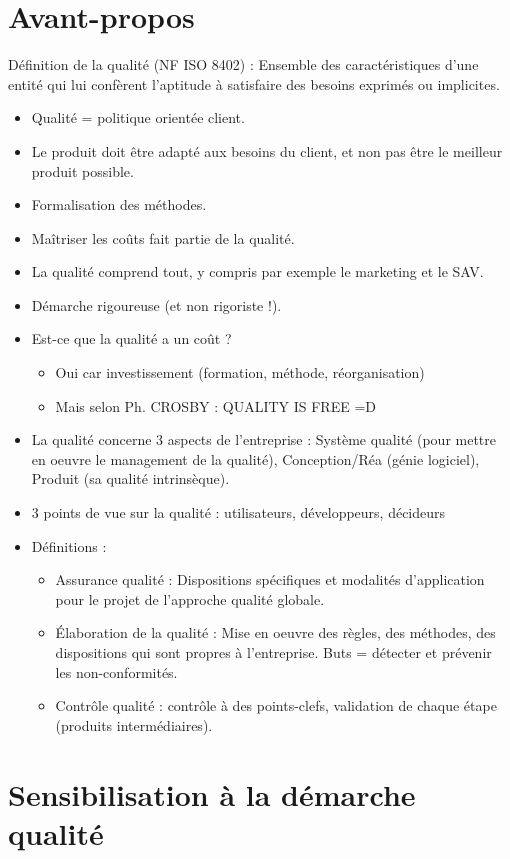 \part*{Avant-propos}
Définition de la qualité (NF ISO 8402) : Ensemble des caractéristiques d’une entité qui lui confèrent l'aptitude à satisfaire des besoins exprimés ou implicites. \\
\begin{itemize}
\item Qualité = politique orientée client. 
\item Le produit doit être adapté aux besoins du client, et non pas être le meilleur produit possible. 
\item Formalisation des méthodes. 
\item Maîtriser les coûts fait partie de la qualité. 
\item La qualité comprend tout, y compris par exemple le marketing et le SAV. 
\item Démarche rigoureuse (et non rigoriste !). 
\item Est-ce que la qualité a un coût ? 
\begin{itemize}
\item Oui car investissement (formation, méthode, réorganisation)
\item Mais selon Ph. CROSBY : \og QUALITY IS FREE \fg =D
\end{itemize}
\item La qualité concerne 3 aspects de l'entreprise : Système qualité (pour mettre en oeuvre le management de la qualité), Conception/Réa (génie logiciel), Produit (sa qualité intrinsèque). 
\item 3 points de vue sur la qualité : utilisateurs, développeurs, décideurs
\item Définitions : 
\begin{itemize}
\item Assurance qualité : Dispositions spécifiques et modalités d'application pour le projet de l'approche qualité globale. 
\item Élaboration de la qualité : Mise en oeuvre des règles, des méthodes, des dispositions qui sont propres à l'entreprise. Buts = détecter et prévenir les non-conformités. 
\item Contrôle qualité : contrôle à des points-clefs, validation de chaque étape (produits intermédiaires). 
\end{itemize}
\end{itemize}
\pagebreak
\part{Sensibilisation à la démarche qualité}
